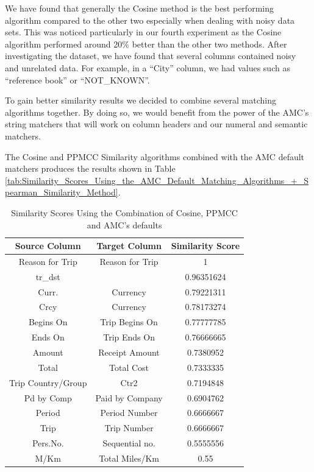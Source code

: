 \documentclass{../../Util/LaTEX/sig-alternate}
\begin{document}
We have found that generally the Cosine method is the best performing algorithm compared to the other two especially when dealing with noisy data sets. This was noticed particularly in our fourth experiment as the Cosine algorithm performed around 20\% better than the other two methods. After investigating the dataset, we have found that several columns contained noisy and unrelated data. For example, in a ``City'' column, we had values such as ``reference book'' or ``NOT\_KNOWN''.

To gain better similarity results we decided to combine several matching algorithms together. By doing so, we would benefit from the power of the AMC's string matchers that will work on column headers and our numeral and semantic matchers.

The Cosine and PPMCC Similarity algorithms combined with the AMC default matchers produces the results shown in Table \ref{tab:Similarity_Scores_Using_the_AMC_Default_Matching_Algorithms_+_Spearman_Similarity_Method}.

\begin{table}[ht]
\centering
\begin{tabular}{|c|c|c|} \hline
\textbf{Source Column} & \textbf{Target Column} & \textbf{Similarity Score} \\ \hline
Reason for Trip & Reason for Trip & 1 \\ \hline
tr\_dst &  & 0.96351624 \\ \hline
Curr. & Currency & 0.79221311 \\ \hline
Crcy & Currency & 0.78173274 \\ \hline
Begins On & Trip Begins On & 0.77777785 \\ \hline
Ends On & Trip Ends On & 0.76666665 \\ \hline
Amount & Receipt Amount & 0.7380952 \\ \hline
Total & Total Cost & 0.7333335 \\ \hline
Trip Country/Group & Ctr2 & 0.7194848 \\ \hline
Pd by Comp & Paid by Company & 0.6904762 \\ \hline
Period & Period Number & 0.6666667 \\ \hline
Trip & Trip Number & 0.6666667 \\ \hline
Pers.No. & Sequential no. & 0.5555556 \\ \hline
M/Km & Total Miles/Km & 0.55 \\ \hline
\end{tabular}
\caption{Similarity Scores Using the Combination of Cosine, PPMCC and AMC's defaults}
\label{tab:Similarity_Scores_Using_the_Combination_of_Cosine,_PPMCC_and_AMC's_defaults}
\end{table}
\end{document}
